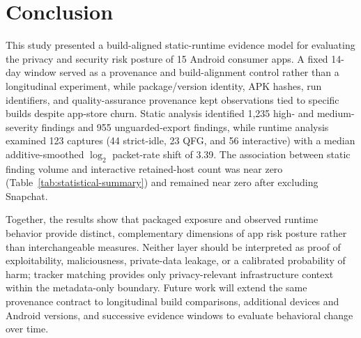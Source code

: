 \section{Conclusion}

This study presented a build-aligned static-runtime evidence model for evaluating the privacy and security risk posture of 15 Android consumer apps. A fixed 14-day window served as a provenance and build-alignment control rather than a longitudinal experiment, while package/version identity, APK hashes, run identifiers, and quality-assurance provenance kept observations tied to specific builds despite app-store churn. Static analysis identified 1,235 high- and medium-severity findings and 955 unguarded-export findings, while runtime analysis examined 123 captures (44 strict-idle, 23 QFG, and 56 interactive) with a median additive-smoothed $\log_{2}$ packet-rate shift of 3.39. The association between static finding volume and interactive retained-host count was near zero (Table~\ref{tab:statistical-summary}) and remained near zero after excluding Snapchat.

Together, the results show that packaged exposure and observed runtime behavior provide distinct, complementary dimensions of app risk posture rather than interchangeable measures. Neither layer should be interpreted as proof of exploitability, maliciousness, private-data leakage, or a calibrated probability of harm; tracker matching provides only privacy-relevant infrastructure context within the metadata-only boundary. Future work will extend the same provenance contract to longitudinal build comparisons, additional devices and Android versions, and successive evidence windows to evaluate behavioral change over time.
